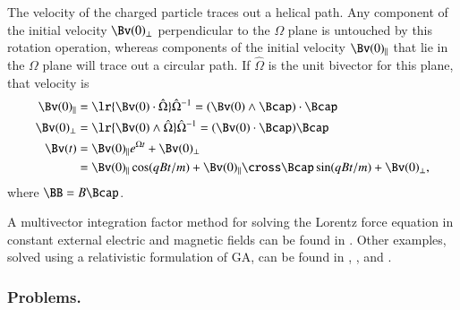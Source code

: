 The velocity of the charged particle traces out a helical path.
Any component of the initial velocity \( \Bv(0)_\perp \) perpendicular to the \( \Omega \) plane is untouched by this rotation operation, whereas components of the initial velocity \( \Bv(0)_\parallel \) that lie in the \( \Omega \) plane will trace out a circular path.
If \( \hat{\Omega} \) is the unit bivector for this plane, that velocity is
\begin{dmath}\label{eqn:lorentzForce_constantMagnetic:220}
\begin{aligned}
\Bv(0)_\parallel &= \lr{ \Bv(0) \cdot \hat{\Omega} } \hat{\Omega}^{-1}
                  = (\Bv(0) \wedge \Bcap) \cdot \Bcap \\
\Bv(0)_\perp &= \lr{ \Bv(0) \wedge \hat{\Omega} } \hat{\Omega}^{-1}
              = (\Bv(0) \cdot \Bcap) \Bcap \\
\Bv(t) &=
\Bv(0)_\parallel e^{\Omega t} + \Bv(0)_\perp \\
       &=
\Bv(0)_\parallel \cos( q B t/ m )
+
\Bv(0)_\parallel \cross \Bcap \sin( q B t/ m )
+ \Bv(0)_\perp,
\end{aligned}
\end{dmath}
where \( \BB = B \Bcap \).

A multivector integration factor method for solving the Lorentz force equation in constant external electric and magnetic fields can be found in \citep{hestenes1999nfc}.  Other examples, solved using a relativistic formulation of GA, can be found in \citep{doran2003gap},
\citep{hestenes1974properdynamics}, and
\citep{hestenes1974propermechanics}.

\subsubsection{Problems.}
